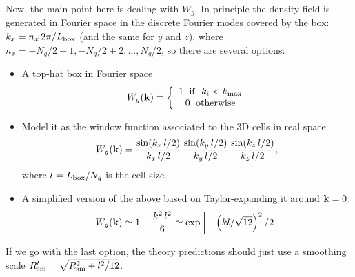\documentclass[a4paper,10pt]{article}
\begin{document}
Now, the main point here is dealing with $W_g$. In principle the density field is generated in Fourier space in the discrete Fourier modes covered by the box: $k_x=n_x\,2\pi/L_{\rm box}$ (and the same for $y$ and $z$), where $n_x=-N_g/2+1,-N_g/2+2,...,N_g/2$, so there are several options:
\begin{itemize}
 \item A top-hat box in Fourier space
   \begin{equation}
     W_g({\bf k})=\left\{
     \begin{array}{c}
       1\hspace{6pt}{\rm if}\hspace{6pt}k_i<k_{\rm max}\\
       0\hspace{6pt}{\rm otherwise}
     \end{array}\right.
   \end{equation}
 \item Model it as the window function associated to the 3D cells in real space:
   \begin{equation}
     W_g({\bf k})=\frac{\sin(k_x\,l/2)}{k_x\,l/2}\,\frac{\sin(k_y\,l/2)}{k_y\,l/2}\,\frac{\sin(k_z\,l/2)}{k_z\,l/2},
   \end{equation}
   where $l=L_{\rm box}/N_g$ is the cell size.
 \item A simplified version of the above based on Taylor-expanding it around ${\bf k}=0$:
   \begin{align}
     W_g({\bf k})\simeq1-\frac{k^2\,l^2}{6}\simeq\exp\left[-\left(kl/\sqrt{12}\right)^2/2\right]
   \end{align}
\end{itemize}
If we go with the last option, the theory predictions should just use a smoothing scale $R'_{\rm sm}=\sqrt{R_{\rm sm}^2+l^2/12}$.



  
\end{document}
